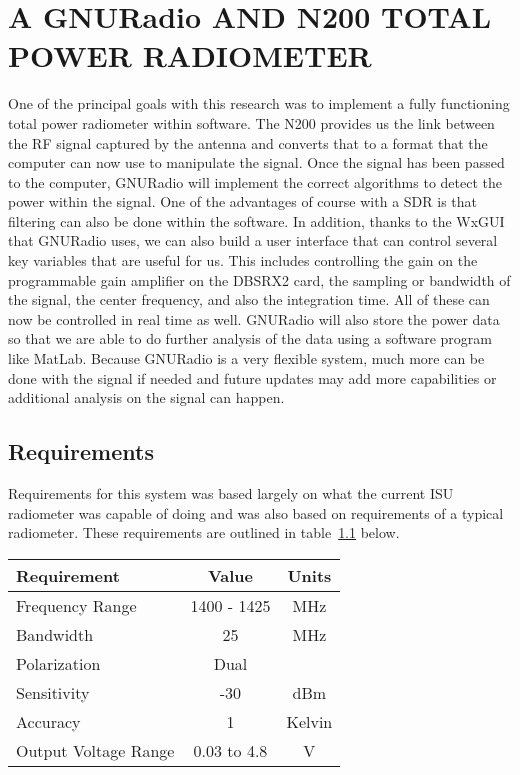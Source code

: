 \chapter{A GNURadio AND N200 TOTAL POWER RADIOMETER}

One of the principal goals with this research was to implement a fully functioning total power radiometer within software.  The N200 provides us the link between the RF signal captured by the antenna and converts that to a format that the computer can now use to manipulate the signal.  Once the signal has been passed to the computer, GNURadio will implement the correct algorithms to detect the power within the signal.  One of the advantages of course with a SDR is that filtering can also be done within the software.  In addition, thanks to the WxGUI that GNURadio uses, we can also build a user interface that can control several key variables that are useful for us.  This includes controlling the gain on the programmable gain amplifier on the DBSRX2 card, the sampling or bandwidth of the signal, the center frequency, and also the integration time.  All of these can now be controlled in real time as well.  GNURadio will also store the power data so that we are able to do further analysis of the data using a software program like MatLab.  Because GNURadio is a very flexible system, much more can be done with the signal if needed and future updates may add more capabilities or additional analysis on the signal can happen.

\section{Requirements}

Requirements for this system was based largely on what the current ISU radiometer was capable of doing and was also based on requirements of a typical radiometer.  These requirements are outlined in table~\ref{requirements} below.


\begin{table}[h!tb] \centering
{}
\label{requirements}
\begin{tabular}{lcc} \hline
\textbf{Requirement} & \textbf{Value} & \textbf{Units} \\ \hline
Frequency Range & 1400 - 1425 & MHz \\
Bandwidth & 25 & MHz \\
Polarization & Dual &  \\ 
Sensitivity & -30 & dBm \\
Accuracy & 1 & Kelvin \\ 
Output Voltage Range & 0.03 to 4.8 & V \\ \hline
\end{tabular}
\end{table}

